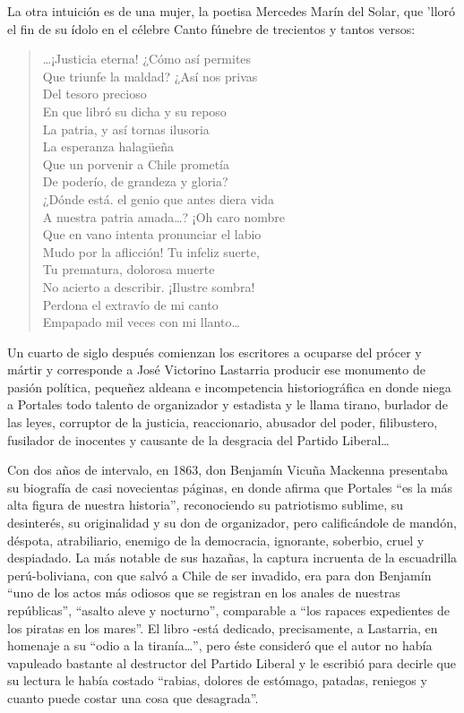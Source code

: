 \documentclass[10pt,twoside,openright]{memoir}
\begin{document}
La otra intuición es de una mujer, la poetisa Mercedes Marín del Solar,
que 'lloró el fin de su ídolo en el célebre Canto fúnebre de trecientos
y tantos versos:

\begin{verse}
\ldots¡Justicia eterna! ¿Cómo así permites\\
Que triunfe la maldad? ¿Así nos privas\\
Del tesoro precioso\\
En que libró su dicha y su reposo\\
La patria, y así tornas ilusoria\\
La esperanza halagüeña\\
Que un porvenir a Chile prometía\\
De poderío, de grandeza y gloria?\\
¿Dónde está. el genio que antes diera vida\\
A nuestra patria amada\ldots? ¡Oh caro nombre\\
Que en vano intenta pronunciar el labio\\
Mudo por la aflicción! Tu infeliz suerte,\\
Tu prematura, dolorosa muerte\\
No acierto a describir. ¡Ilustre sombra!\\
Perdona el extravío de mi canto\\
Empapado mil veces con mi llanto\ldots
\end{verse}

Un cuarto de siglo después comienzan los escritores a ocuparse del
prócer y mártir y corresponde a José Victorino Lastarria producir ese
monumento de pasión política, pequeñez aldeana e incompetencia
historiográfica en donde niega a Portales todo talento de organizador y
estadista y le llama tirano, burlador de las leyes, corruptor de la
justicia, reaccionario, abusador del poder, filibustero, fusilador de
inocentes y causante de la desgracia del Partido Liberal\ldots

Con dos años de intervalo, en 1863, don Benjamín Vicuña Mackenna
presentaba su biografía de casi novecientas páginas, en donde afirma que
Portales ``es la más alta figura de nuestra historia'', reconociendo su
patriotismo sublime, su desinterés, su originalidad y su don de
organizador, pero calificándole de mandón, déspota, atrabiliario,
enemigo de la democracia, ignorante, soberbio, cruel y despiadado. La
más notable de sus hazañas, la captura incruenta de la escuadrilla
perú-boliviana, con que salvó a Chile de ser invadido, era para don
Benjamín ``uno de los actos más odiosos que se registran en los anales de
nuestras repúblicas'', ``asalto aleve y nocturno'', comparable a ``los
rapaces expedientes de los piratas en los mares''. El libro -está
dedicado, precisamente, a Lastarria, en homenaje a su ``odio a la
tiranía\ldots'', pero éste consideró que el autor no había vapuleado
bastante al destructor del Partido Liberal y le escribió para decirle
que su lectura le había costado ``rabias, dolores de estómago, patadas,
reniegos y cuanto puede costar una cosa que desagrada''.
\end{document}
